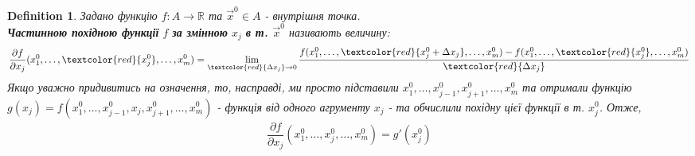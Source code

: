 \documentclass[a4paper, 10pt]{article}
\def\departial#1#2{\dfrac{\partial {#1}}{\partial {#2}}}
\def\huge{\displaystyle}
\theoremstyle{theoremdd}
\theoremstyle{theoremdd}
\theoremstyle{theoremdd}
\newtheorem{definition}[theorem]{Definition}
\theoremstyle{theoremdd}
\theoremstyle{theoremdd}
\theoremstyle{theoremdd}
\theoremstyle{theoremdd}
\theoremstyle{theoremdd}
\theoremstyle{theoremdd}
\begin{document}
\begin{definition}
Задано функцію $f: A \to \mathbb{R}$ та $\vec{x}^0 \in A$ - внутрішня точка.\\
\textbf{Частинною похідною функції} $f$ \textbf{за змінною} $x_j$ \textbf{в т. $\vec{x}^0$} називають величину:
\begin{align*}
\dfrac{\partial f}{\partial x_j} (x_1^0, \dots, \textcolor{red}{x_j^0}, \dots, x_m^0) = \huge \lim_{\textcolor{red}{\Delta x_j} \to 0} \dfrac{f(x_1^0,\dots,\textcolor{red}{x_j^0 + \Delta x_j}, \dots, x_m^0) - f(x_1^0,\dots,\textcolor{red}{x_j^0}, \dots, x_m^0)}{\textcolor{red}{\Delta x_j}}
\end{align*}
Якщо уважно придивитись на означення, то, насправді, ми просто підставили $x_1^0,\dots,x_{j-1}^0,x_{j+1}^0,\dots,x_m^0$ та отримали функцію $g(x_j) = f(x_1^0,\dots,x_{j-1}^0,x_j,x_{j+1}^0,\dots, x_m^0)$ - функція від одного агрументу $x_j$ - та обчислили похідну цієї функції в т. $x_j^0$. Отже,
\begin{align*}
\departial{f}{x_j}(x_1^0,\dots,x_j^0,\dots,x_m^0) = g'(x_j^0)
\end{align*}
\end{definition}
\end{document}
